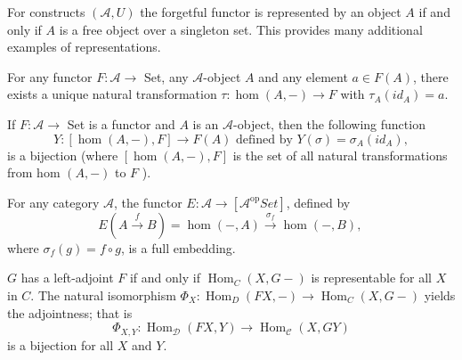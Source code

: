 \begin{prop}
    For constructs $(\mathcal{A}, U)$ the forgetful functor is represented by an object $A$ if and only if $A$ is a free object over a singleton set. This provides many additional examples of representations.
\end{prop}



\begin{theo}
    For any functor $F: \mathcal{A} \rightarrow$ Set, any $\mathcal{A}$-object $A$ and any element $a \in F(A)$, there exists a unique natural transformation $\tau: \operatorname{hom}(A,-) \rightarrow F$ with $\tau_A\left(i d_A\right)=a$.
\end{theo}

\begin{coro}
    If $F: \mathcal{A} \rightarrow$ Set is a functor and $A$ is an $\mathcal{A}$-object, then the following function
    $$
    Y:[\operatorname{hom}(A,-), F] \rightarrow F(A) \text { defined by } Y(\sigma)=\sigma_A\left(i d_A\right),
    $$
    is a bijection (where $[\operatorname{hom}(A,-), F]$ is the set of all natural transformations from hom $(A,-)$ to $F$ ).
    
\end{coro}

\begin{coro}
    For any category $\mathcal{A}$, the functor $E: \mathcal{A} \rightarrow\left[\mathcal{A}^{\mathrm{op}} Set \right]$, defined by
$$
E(A \xrightarrow{f} B)=\operatorname{hom}(-, A) \xrightarrow{\sigma_f} \operatorname{hom}(-, B) \text {, }
$$
where $\sigma_f(g)=f \circ g$, is a full embedding.
\end{coro}


\begin{prop}
$G$ has a left-adjoint $F$ if and only if $\operatorname{Hom}_C(X, G-)$ is representable for all $X$ in $C$. The natural isomorphism $\Phi_X: \operatorname{Hom}_D(F X,-) \rightarrow \operatorname{Hom}_C(X, G-)$ yields the adjointness; that is
$$
\Phi_{X, Y}: \operatorname{Hom}_{\mathcal{D}}(F X, Y) \rightarrow \operatorname{Hom}_{\mathcal{C}}(X, G Y)
$$
is a bijection for all $X$ and $Y$.    
\end{prop}








